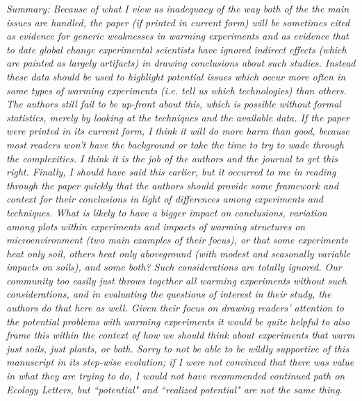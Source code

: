 \documentclass[11pt,a4paper]{letter}
\begin{document}
\begin{letter}{}
\begin{enumerate}
\begin{enumerate}
\end{enumerate}
\end{enumerate}
\emph{Summary: Because of what I view as inadequacy of the way both of the the
main issues are handled, the paper (if printed in current form) will be
sometimes cited as evidence for generic weaknesses in warming experiments
and as evidence that to date global change experimental scientists have
ignored indirect effects (which are painted as largely artifacts) in drawing
conclusions about such studies.
Instead these data should be used to highlight potential issues which occur
more often in some types of warming experiments (i.e. tell us which
technologies) than others. The authors still fail to be up-front about this, which
is possible without formal statistics, merely by looking at the techniques and
the available data.
If the paper were printed in its current form, I think it will do more harm than
good, because most readers won't have the background or take the time to try
to wade through the complexities. I think it is the job of the authors and the
journal to get this right.
Finally, I should have said this earlier, but it occurred to me in reading through
the paper quickly that the authors should provide some framework and
context for their conclusions in light of differences among experiments and
techniques. What is likely to have a bigger impact on conclusions, variation
among plots within experiments and impacts of warming structures on
microenvironment (two main examples of their focus), or that some
experiments heat only soil, others heat only aboveground (with modest and
seasonally variable impacts on soils), and some both? Such considerations
are totally ignored. Our community too easily just throws together all warming
experiments without such considerations, and in evaluating the questions of
interest in their study, the authors do that here as well. Given their focus on
drawing readers' attention to the potential problems with warming experiments
it would be quite helpful to also frame this within the context of how we should
think about experiments that warm just soils, just plants, or both.
Sorry to not be able to be wildly supportive of this manuscript in its step-wise
evolution; if I were not convinced that there was value in what they are trying
to do, I would not have recommended continued path on Ecology Letters, but
``potential" and ``realized potential" are not the same thing.}

\end{letter}
\end{document}
